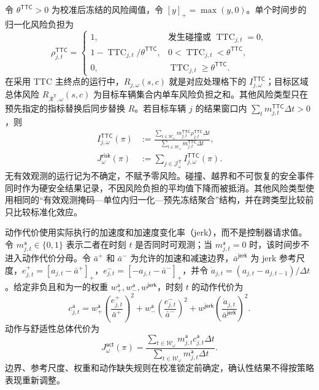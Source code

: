 \documentclass[10pt,a4paper,twocolumn]{article}
\begin{document}
令 $\theta^{\mathsf{TTC}}>0$ 为校准后冻结的风险阈值，令 $[y]_+=\max(y,0)$。单个时间步的归一化风险负担为
\begin{equation*}
\rho_{j,t}^{\mathsf{TTC}}=
\begin{cases}
1,&\text{发生碰撞或 }\operatorname{TTC}_{j,t}=0,\\
1-\operatorname{TTC}_{j,t}/\theta^{\mathsf{TTC}},
&0<\operatorname{TTC}_{j,t}<\theta^{\mathsf{TTC}},\\
0,&\operatorname{TTC}_{j,t}\geq\theta^{\mathsf{TTC}}.
\end{cases}
\end{equation*}
在采用 TTC 主终点的运行中，$R_{j,\omega}(s,c)$ 就是对应处理格下的 $I_{j,\omega}^{\mathsf{TTC}}$；目标区域总体风险 $R_{\mathcal R^{\mathsf T},\omega}(s,c)$ 为目标车辆集合内单车风险负担之和。其他风险类型只在预先指定的指标替换后同步替换 $R$。若目标车辆 $j$ 的结果窗口内 $\sum_t m_{j,t}^{\mathsf{TTC}}\Delta t>0$，则
\begin{equation*}
\begin{aligned}
I_{j,\omega}^{\mathsf{TTC}}(\pi)
&:=\frac{\sum_{t\in\mathcal W_\omega}m_{j,t}^{\mathsf{TTC}}
\rho_{j,t}^{\mathsf{TTC}}\Delta t}
{\sum_{t\in\mathcal W_\omega}m_{j,t}^{\mathsf{TTC}}\Delta t},\\
J_{\omega}^{\mathsf{risk}}(\pi)
&:=\sum_{j\in\mathcal J^{\mathsf T}_{\omega}}I_{j,\omega}^{\mathsf{TTC}}(\pi).
\end{aligned}
\end{equation*}
无有效观测的运行记为不确定，不赋予零风险。碰撞、越界和不可恢复的安全事件同时作为硬安全结果记录，不因风险负担的平均值下降而被抵消。其他风险类型使用相同的“有效观测掩码—单位内归一化—预先冻结聚合”结构，并在跨类型比较前只比较标准化效应。

动作代价使用实际执行的加速度和加速度变化率（jerk），而不是控制器请求值。令 $m_{j,t}^{\mathsf a}\in\{0,1\}$ 表示二者在时刻 $t$ 是否同时可观测；当 $m_{j,t}^{\mathsf a}=0$ 时，该时间步不进入动作代价分母。令 $\bar a^{+}$ 和 $\bar a^{-}$ 为允许的加速和减速边界，$\bar a^{\mathsf{jerk}}$ 为 jerk 参考尺度，$e_{j,t}^{+}=[a_{j,t}-\bar a^{+}]_+$，$e_{j,t}^{-}=[-a_{j,t}-\bar a^{-}]_+$，并令 $\dot a_{j,t}=(a_{j,t}-a_{j,t-1})/\Delta t$。给定非负且和为一的权重 $w_{+}^{\mathsf a},w_{-}^{\mathsf a},w^{\mathsf{jerk}}$，时刻 $t$ 的动作代价为
\begin{equation*}
c_{j,t}^{\mathsf a}=
w_{+}^{\mathsf a}\left(\frac{e_{j,t}^{+}}{\bar a^{+}}\right)^2+
w_{-}^{\mathsf a}\left(\frac{e_{j,t}^{-}}{\bar a^{-}}\right)^2+
w^{\mathsf{jerk}}\left(\frac{\dot a_{j,t}}{\bar a^{\mathsf{jerk}}}\right)^2.
\end{equation*}
动作与舒适性总体代价为
\begin{equation*}
J_{\omega}^{\mathsf{act}}(\pi)
=\frac{\sum_{t\in\mathcal W_\omega}m_{j,t}^{\mathsf a}
c_{j,t}^{\mathsf a}\Delta t}
{\sum_{t\in\mathcal W_\omega}m_{j,t}^{\mathsf a}\Delta t}.
\end{equation*}
边界、参考尺度、权重和动作缺失规则在校准锁定前确定，确认性结果不得按策略表现重新调整。
\end{document}
